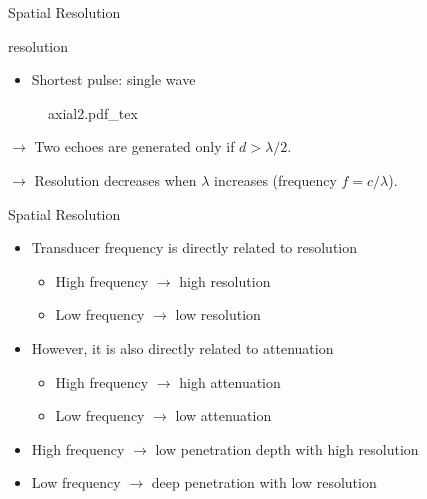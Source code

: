 \begin{frame}{Spatial Resolution \cont}

     resolution \cont
    \begin{itemize}
        \item Shortest pulse: single wave
    \end{itemize}

    \begin{figure}
        \def\svgwidth{\linewidth}
        {axial2.pdf_tex}
    \end{figure}

    $\rightarrow$ Two  echoes are generated only if $d > \lambda/2$.

    $\rightarrow$ Resolution decreases when $\lambda$ increases (frequency $f = c/\lambda $).
\end{frame}


\begin{frame}{Spatial Resolution \cont}

    \begin{itemize}
        \item Transducer frequency is directly related to resolution
              \begin{itemize}
                  \item High frequency $\rightarrow$ high resolution
                  \item Low frequency $\rightarrow$ low resolution
              \end{itemize}
              \vspace{.3cm}
        \item However, it is also directly related to attenuation
              \begin{itemize}
                  \item High frequency $\rightarrow$ high attenuation
                  \item Low frequency $\rightarrow$ low attenuation
              \end{itemize}
              \vspace{.3cm}
        \item High frequency $\rightarrow$ low penetration depth with high resolution
              \vspace{.3cm}
        \item Low frequency $\rightarrow$ deep penetration with low resolution
    \end{itemize}

\end{frame}


